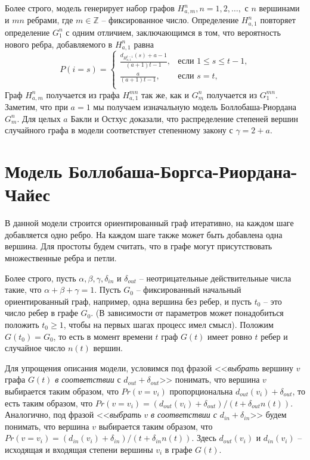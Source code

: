\documentclass[14pt]{extreport}
\begin{document}
Более строго, модель генерирует набор графов $H_{a, m}^n, n=1, 2,\dots,$ с $n$ вершинами и $mn$ ребрами, где $m \in \mathbb{Z}$ -- фиксированное число. Определение $H_{a, 1}^n$ повторяет определение $G_1^n$ с одним отличием, заключающимся в том, что вероятность нового ребра, добавляемого в $H_{a, 1}^n$ равна
$$  
P(i=s) =
\begin{cases}  
  \frac{d_{H_{a, 1}^{t-1}}(s)+a-1}{(a+1)t-1},&\text{если $1 \le s \le t-1$,}\\
  \frac{a}{(a+1)t-1},&\text{если $s=t$,}\\
\end{cases}
$$  
Граф $H_{a, m}^n$ получается из графа $H_{a, 1}^{mn}$ так же, как и $G_m^n$ получается из $G_1^{mn}$. Заметим, что при $a=1$ мы получаем изначальную модель Боллобаша-Риордана $G_m^n$. Для целых $a$ Бакли и Остхус доказали, что распределение степеней вершин случайного графа в модели соответствует степенному закону с $\gamma = 2 + a$.
 
\section{Модель Боллобаша-Боргса-Риордана-Чайес}

В данной модели строится ориентированный граф итеративно, на каждом шаге добавляется одно ребро. На каждом шаге также может быть добавлена одна вершина. Для простоты будем считать, что в графе могут присутствовать множественные ребра и петли.

Более строго, пусть $\alpha, \beta, \gamma, \delta_{in}$ и $\delta_{out}$ -- неотрицательные действительные числа такие, что $\alpha + \beta + \gamma = 1$. Пусть $G_0$ -- фиксированный начальный ориентированный граф, например, одна вершина без ребер, и пусть $t_0$ -- это число ребер в графе $G_0$. (В зависимости от параметров может понадобиться положить $t_0 \ge 1$, чтобы на первых шагах процесс имел смысл). Положим $G(t_0) = G_0$, то есть в момент времени $t$ граф $G(t)$ имеет ровно $t$ ребер и случайное число $n(t)$ вершин.

Для упрощения описания модели, условимся под фразой <<{\it выбрать} вершину $v$ графа $G(t)$ {\it в соответствии} с $d_{out} + \delta_{out}$>> понимать, что вершина $v$ выбирается таким образом, что $Pr(v=v_i)$ пропорциональна $d_{out}(v_i) + \delta_{out}$, то есть таким образом, что $Pr(v=v_i)=(d_{out}(v_i) + \delta_{out})/(t  + \delta_{out}n(t))$. Аналогично, под фразой <<{\it выбрать} $v$ {\it в соответствии с} $d_{in} + \delta_{in}$>> будем понимать, что вершина $v$ выбирается таким образом, что $Pr(v=v_i)=(d_{in}(v_i) + \delta_{in})/(t  + \delta_{in}n(t))$. Здесь $d_{out}(v_i)$ и $d_{in}(v_i)$ -- исходящая и входящая степени вершины $v_i$ в графе $G(t)$.
\end{document}

